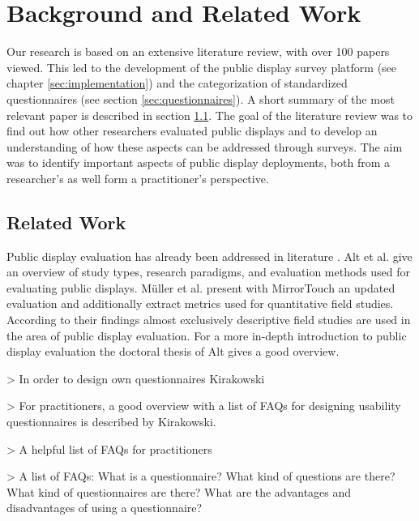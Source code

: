 \section{Background and Related Work} %
\label{chapter:background_related-work}

	Our research is based on an extensive literature review, with over 100 papers viewed. This led to the development of the public display survey platform (see chapter \ref{sec:implementation}) and the categorization of standardized questionnaires (see section \ref{sec:questionnaires}). A short summary of the most relevant paper is described in section \ref{sec:related-work}.
	The goal of the literature review was to find out how other researchers evaluated public displays and to develop an understanding of how these aspects can be addressed through surveys. The aim was to identify important aspects of public display deployments, both from a researcher's as well form a practitioner's perspective. 


\subsection{Related Work}
\label{sec:related-work}

	Public display evaluation has already been addressed in literature \cite{Alt2012HowToEvaluate, muller2014mirrortouch}. Alt et al. \cite{Alt2012HowToEvaluate} give an overview of study types, research paradigms, and evaluation methods used for evaluating public displays. M{\"u}ller et al. \cite{muller2014mirrortouch} present with MirrorTouch an updated evaluation and additionally extract metrics used for quantitative field studies. According to their findings almost exclusively descriptive field studies are used in the area of public display evaluation. For a more in-depth introduction to public display evaluation the doctoral thesis of Alt \cite{alt2013thesis} gives a good overview.

		> In order to design own questionnaires Kirakowski \cite{kirakowski2000questionnaireFAQ} 

		> For practitioners, a good overview with a list of FAQs for designing usability questionnaires is described by Kirakowski.

		> A helpful list of FAQs for practitioners
			
		> A list of FAQs: What is a questionnaire? What kind of questions are there? What kind of questionnaires are there? What are the advantages and disadvantages of using a questionnaire?

